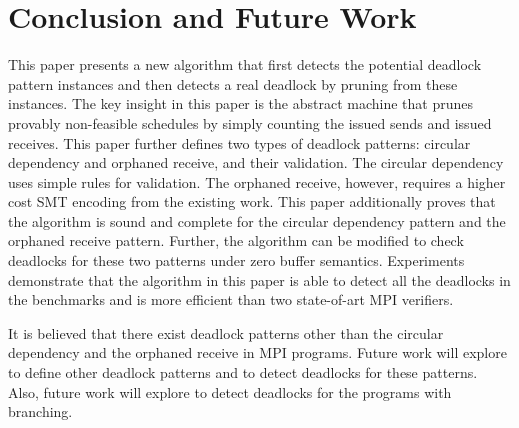 \section{Conclusion and Future Work}
This paper presents a new algorithm that first detects the potential deadlock pattern instances and then detects a real deadlock by pruning from these instances.
The key insight in this paper is the abstract machine that prunes provably non-feasible schedules by simply counting the issued sends and issued receives. 
This paper further defines two types of deadlock patterns: circular dependency and orphaned receive, and their validation. The circular dependency uses simple rules for validation. The orphaned receive, however, requires a higher cost SMT encoding from the existing work. This paper additionally proves that the algorithm is sound and complete for the circular dependency pattern and the orphaned receive pattern.
Further, the algorithm can be modified to check deadlocks for these two patterns under zero buffer semantics. Experiments demonstrate that the algorithm in this paper is able to detect all the deadlocks in the benchmarks and is more efficient than two state-of-art MPI verifiers.

It is believed that there exist deadlock patterns other than the circular dependency and the orphaned receive in MPI programs.
Future work will explore to define other deadlock patterns and to detect deadlocks for these patterns. Also, future work will explore to detect deadlocks for the programs with branching. 

\newpage